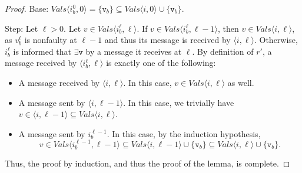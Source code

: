 \documentclass[11pt]{article}
\theoremstyle{definition}
\newcommand{\mv}{\mathtt{v}}
\newcommand{\existsv}{\exists{\mv}}
\newcommand{\knownvals}[1]{\ensuremath{\mathit{Vals}\node{#1}}}
\newcommand{\set}[1]{\{#1\}}
\newcommand{\node}[1]{\langle#1\rangle}
\begin{document}
\begin{proof}
Base: $\knownvals{i_b^0,0} = \set{\mathtt{v}_b} \subseteq \knownvals{i,0} \cup \set{\mathtt{v}_b}$.

Step: Let $\ell>0$.
Let $v \in \knownvals{i_b^{\ell},\ell}$.
If $v \in \knownvals{i_b^{\ell},\ell-1}$, then
$v \in \knownvals{i,\ell}$, as $v_b^{\ell}$
is nonfaulty at $\ell-1$ and thus its message is received by $\node{i,\ell}$.
Otherwise, $i_b^{\ell}$ is informed that $\existsv$ by a message it receives
at $\ell$.
By definition of $r'$, a message received by $\node{i_b^{\ell},\ell}$ is exactly
one of the following:
\begin{itemize}
\item
A message received by $\node{i,\ell}$. In this case, $v \in \knownvals{i,\ell}$ as well.
\item
A message sent by $\node{i,\ell-1}$. In this case, we trivially have
$v \in \node{i,\ell-1} \subseteq \knownvals{i,\ell}$.
\item
A message sent by $i_b^{\ell-1}$. In this case, by the induction hypothesis,
\[
v \in \knownvals{i_b^{\ell-1},\ell-1} \subseteq \knownvals{i,\ell-1} \cup \set{\mathtt{v}_b}
\subseteq \knownvals{i,\ell} \cup \set{\mathtt{v}_b}.\]
\end{itemize}
Thus, the proof by induction, and thus the proof of the lemma, is complete.
\end{proof}
\end{document}
